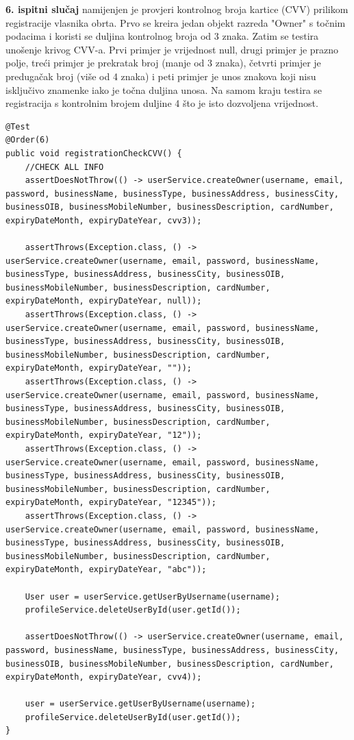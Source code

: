        \textbf{6. ispitni slučaj}{ namijenjen je provjeri kontrolnog broja kartice (CVV) prilikom registracije vlasnika obrta. Prvo se kreira jedan objekt razreda "Owner" s točnim podacima i koristi se duljina kontrolnog broja od 3 znaka. Zatim se testira unošenje krivog CVV-a. Prvi primjer je vrijednost null, drugi primjer je prazno polje, treći primjer je prekratak broj (manje od 3 znaka), četvrti primjer je predugačak broj (više od 4 znaka) i peti primjer je unos znakova koji nisu isključivo znamenke iako je točna duljina unosa. Na samom kraju testira se registracija s kontrolnim brojem duljine 4 što je isto dozvoljena vrijednost.}
        \begin{lstlisting}
@Test
@Order(6)
public void registrationCheckCVV() {
    //CHECK ALL INFO
    assertDoesNotThrow(() -> userService.createOwner(username, email, password, businessName, businessType, businessAddress, businessCity, businessOIB, businessMobileNumber, businessDescription, cardNumber, expiryDateMonth, expiryDateYear, cvv3));

    assertThrows(Exception.class, () -> userService.createOwner(username, email, password, businessName, businessType, businessAddress, businessCity, businessOIB, businessMobileNumber, businessDescription, cardNumber, expiryDateMonth, expiryDateYear, null));
    assertThrows(Exception.class, () -> userService.createOwner(username, email, password, businessName, businessType, businessAddress, businessCity, businessOIB, businessMobileNumber, businessDescription, cardNumber, expiryDateMonth, expiryDateYear, ""));
    assertThrows(Exception.class, () -> userService.createOwner(username, email, password, businessName, businessType, businessAddress, businessCity, businessOIB, businessMobileNumber, businessDescription, cardNumber, expiryDateMonth, expiryDateYear, "12"));
    assertThrows(Exception.class, () -> userService.createOwner(username, email, password, businessName, businessType, businessAddress, businessCity, businessOIB, businessMobileNumber, businessDescription, cardNumber, expiryDateMonth, expiryDateYear, "12345"));
    assertThrows(Exception.class, () -> userService.createOwner(username, email, password, businessName, businessType, businessAddress, businessCity, businessOIB, businessMobileNumber, businessDescription, cardNumber, expiryDateMonth, expiryDateYear, "abc"));

    User user = userService.getUserByUsername(username);
    profileService.deleteUserById(user.getId());

    assertDoesNotThrow(() -> userService.createOwner(username, email, password, businessName, businessType, businessAddress, businessCity, businessOIB, businessMobileNumber, businessDescription, cardNumber, expiryDateMonth, expiryDateYear, cvv4));

    user = userService.getUserByUsername(username);
    profileService.deleteUserById(user.getId());
}
        \end{lstlisting}

